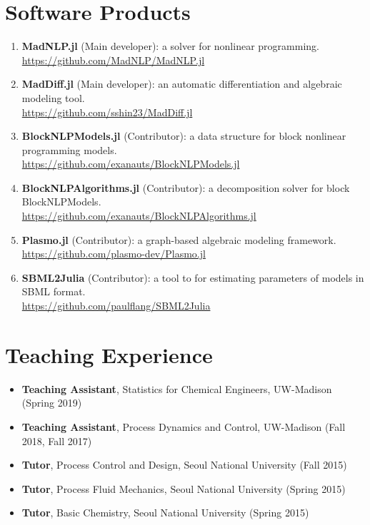 \documentclass{article}
\begin{document}
\section*{Software Products}
\begin{enumerate}
\renewcommand*{\labelenumi}{[S\theenumi]}
\item {\bf MadNLP.jl} (Main developer): a solver for nonlinear programming.\\
  \url{https://github.com/MadNLP/MadNLP.jl}
\item {\bf MadDiff.jl} (Main developer): an automatic differentiation and algebraic modeling tool.\\
  \url{https://github.com/sshin23/MadDiff.jl}
\item {\bf BlockNLPModels.jl} (Contributor): a data structure for block nonlinear programming models.\\
  \url{https://github.com/exanauts/BlockNLPModels.jl}
\item {\bf BlockNLPAlgorithms.jl} (Contributor): a decomposition solver for block BlockNLPModels.\\
  \url{https://github.com/exanauts/BlockNLPAlgorithms.jl}
\item {\bf Plasmo.jl} (Contributor): a graph-based algebraic modeling framework.\\
\url{https://github.com/plasmo-dev/Plasmo.jl}
\item {\bf SBML2Julia} (Contributor): a tool to for estimating parameters of models in SBML format.\\
\url{https://github.com/paulflang/SBML2Julia}
\end{enumerate}

\section*{Teaching Experience}
\begin{itemize}[leftmargin=*]
\item[] {\bf Teaching Assistant}, Statistics for Chemical Engineers, UW-Madison (Spring 2019)
\item[] {\bf Teaching Assistant}, Process Dynamics and Control, UW-Madison (Fall 2018, Fall 2017)
\item[] {\bf Tutor}, Process Control and Design, Seoul National University (Fall 2015)
\item[] {\bf Tutor}, Process Fluid Mechanics, Seoul National University (Spring 2015)
\item[] {\bf Tutor}, Basic Chemistry, Seoul National University (Spring 2015)
\end{itemize}
\end{document}
